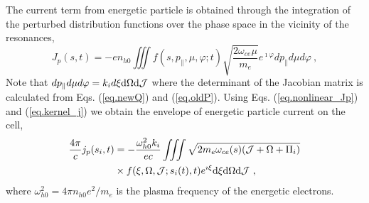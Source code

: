 The current term from energetic particle 
is obtained through the integration  of the perturbed distribution functions over the phase space in the vicinity of the resonances, 
\begin{equation}\label{eq.nonlinear_Jp}
    J_p(s, t)=-e n_{h 0} \iiint f\left(s, p_{\parallel}, \mu, \varphi ; t\right) \sqrt{\frac{2 \omega_{ce} \mu}{m_{e}}} e^{\imath \varphi} d p_{\parallel} d \mu d \varphi~,
\end{equation}
Note that $d p_{\parallel} d \mu d \varphi=k_i d \xi \rm d \Omega \rm d \mathcal{J}$
where the determinant of the Jacobian matrix  is calculated from Eqs. (\ref{eq.newQ}) and (\ref{eq.oldP}). 
Using Eqs. (\ref{eq.nonlinear_Jp}) 
and 
(\ref{eq.kernel_j})
we obtain 
the envelope of energetic particle current  on the cell,
\begin{equation}\label{eq.nonlinear_J}
\begin{aligned}
 {4 \pi \over c}    j_p(s_i,t) &=
 - \frac{\omega_{h0}^2k_i}{ec}\iiint \sqrt{2m_e\omega_{ce}(s)(\mathcal{J}+\Omega+\Pi_i)}\\
 &\times f(\xi,\Omega,\mathcal{J};s_i(t),t)e^{\imath \xi} \rm d \xi \rm d \Omega \rm d \mathcal{J}~,   
    \end{aligned}
\end{equation}
where $\omega^2_{h0} = 4 \pi n_{h0} e^2 /m_e$ is the plasma frequency of the energetic electrons.

